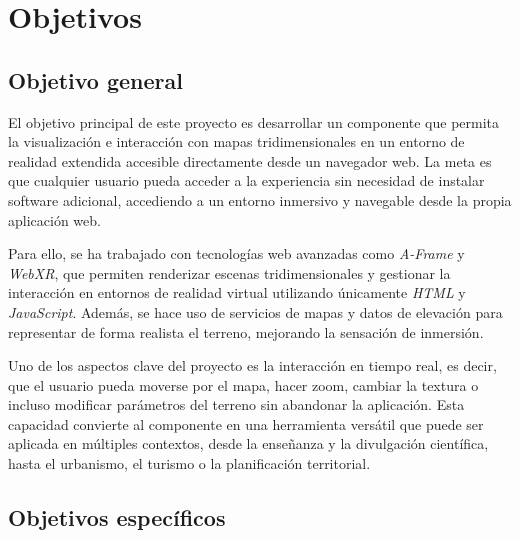 \documentclass[a4paper, 12pt]{book}
\begin{document}
\cleardoublepage %
\chapter{Objetivos} %
\label{chap:objetivos} %

\section{Objetivo general} %
\label{sec:objetivo-general} %



El objetivo principal de este proyecto es desarrollar un componente que permita la visualización e interacción con mapas tridimensionales en un entorno de realidad extendida accesible directamente desde un navegador web. La meta es que cualquier usuario pueda acceder a la experiencia sin necesidad de instalar software adicional, accediendo a un entorno inmersivo y navegable desde la propia aplicación web.

Para ello, se ha trabajado con tecnologías web avanzadas como \textit{A-Frame} y \textit{WebXR}, que permiten renderizar escenas tridimensionales y gestionar la interacción en entornos de realidad virtual utilizando únicamente \textit{HTML} y \textit{JavaScript}. Además, se hace uso de servicios de mapas y datos de elevación para representar de forma realista el terreno, mejorando la sensación de inmersión.

Uno de los aspectos clave del proyecto es la interacción en tiempo real, es decir, que el usuario pueda moverse por el mapa, hacer zoom, cambiar la textura o incluso modificar parámetros del terreno sin abandonar la aplicación. Esta capacidad convierte al componente en una herramienta versátil que puede ser aplicada en múltiples contextos, desde la enseñanza y la divulgación científica, hasta el urbanismo, el turismo o la planificación territorial.


\section{Objetivos específicos}
\label{sec:objetivos-especificos}
\end{document}

